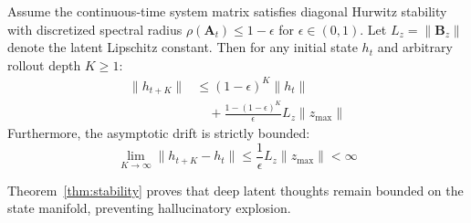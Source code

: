 \begin{theorem}
\label{thm:stability}
Assume the continuous-time system matrix satisfies diagonal Hurwitz stability with discretized spectral radius $\rho(\mathbf{A}_t) \le 1 - \epsilon$ for $\epsilon \in (0, 1)$. Let $L_z = \|\mathbf{B}_z\|$ denote the latent Lipschitz constant. Then for any initial state $h_t$ and arbitrary rollout depth $K \ge 1$:
\begin{equation}
\begin{split}
    \|h_{t+K}\| &\le (1 - \epsilon)^K \|h_t\| \\
    &\quad + \frac{1 - (1 - \epsilon)^K}{\epsilon} L_z \|z_{\mathrm{max}}\|
\end{split}
\end{equation}
Furthermore, the asymptotic drift is strictly bounded:
\begin{equation}
    \lim_{K \rightarrow \infty} \|h_{t+K} - h_t\| \le \frac{1}{\epsilon} L_z \|z_{\mathrm{max}}\| < \infty
\end{equation}
\end{theorem}
Theorem~\ref{thm:stability} proves that deep latent thoughts remain bounded on the state manifold, preventing hallucinatory explosion.


